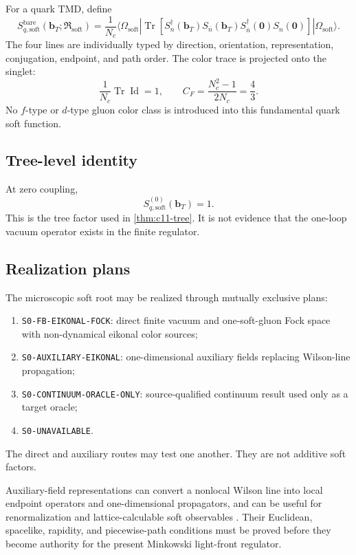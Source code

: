 \documentclass[11pt]{article}
\newcommand{\Tr}{\operatorname{Tr}}
\newcommand{\Id}{\operatorname{Id}}
\newcommand{\TMD}{\ensuremath{\mathrm{TMD}}}
\newcommand{\bT}{\bm b_T}
\newcommand{\Soft}{\ensuremath{\mathrm{soft}}}
\newcommand{\Bare}{\ensuremath{\mathrm{bare}}}
\begin{document}
For a quark \TMD, define
\begin{equation}
 S_{q,\Soft}^{\Bare}
 (\bT;\mathfrak R_{\Soft})
 =
 \frac{1}{N_c}
 \langle\Omega_{\Soft}|
 \Tr\left[
 S_n^\dagger(\bT)
 S_{\bar n}(\bT)
 S_{\bar n}^\dagger(\bm0)
 S_n(\bm0)
 \right]
 |\Omega_{\Soft}\rangle.
 \label{eq:soft-factor}
\end{equation}
The four lines are individually typed by direction, orientation, representation, conjugation, endpoint, and path order.  The color trace is projected onto the singlet:
\begin{equation}
 \frac{1}{N_c}\Tr\Id = 1,
 \qquad
 C_F=\frac{N_c^2-1}{2N_c}=\frac43.
 \label{eq:soft-color}
\end{equation}
No \(f\)-type or \(d\)-type gluon color class is introduced into this fundamental quark soft function.

\subsection{Tree-level identity}

At zero coupling,
\begin{equation}
 S_{q,\Soft}^{(0)}(\bT)=1.
 \label{eq:soft-tree}
\end{equation}
This is the tree factor used in \cref{thm:c11-tree}.  It is not evidence that the one-loop vacuum operator exists in the finite regulator.

\subsection{Realization plans}

The microscopic soft root may be realized through mutually exclusive plans:
\begin{enumerate}
\item \texttt{S0-FB-EIKONAL-FOCK}: direct finite vacuum and one-soft-gluon Fock space with non-dynamical eikonal color sources;
\item \texttt{S0-AUXILIARY-EIKONAL}: one-dimensional auxiliary fields replacing Wilson-line propagation;
\item \texttt{S0-CONTINUUM-ORACLE-ONLY}: source-qualified continuum result used only as a target oracle;
\item \texttt{S0-UNAVAILABLE}.
\end{enumerate}
The direct and auxiliary routes may test one another.  They are not additive soft factors.

Auxiliary-field representations can convert a nonlocal Wilson line into local endpoint operators and one-dimensional propagators, and can be useful for renormalization and lattice-calculable soft observables \cite{GreenJansenSteffens2020,FrancisEtAl2023}.  Their Euclidean, spacelike, rapidity, and piecewise-path conditions must be proved before they become authority for the present Minkowski light-front regulator.
\end{document}
